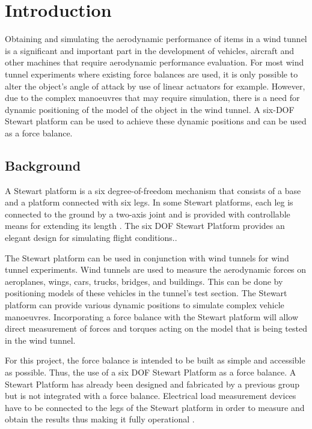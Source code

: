 \section{Introduction}
\label{sec:introduction}
Obtaining and simulating the aerodynamic performance of items in a wind tunnel is a
significant and important part in the development of vehicles, aircraft and other machines
that require aerodynamic performance evaluation. For most wind tunnel experiments where existing force balances are used,
it is only possible to alter the object's angle of attack by use of linear  actuators for example.
However, due to the complex manoeuvres that
may require simulation, there is a need for dynamic positioning of the model of the object
in the wind tunnel. A six-DOF Stewart platform can be used to achieve these dynamic positions and can be used as a force balance.
\subsection{Background}
A Stewart platform is a six degree-of-freedom mechanism that consists of a base and a platform connected with six legs. In some Stewart platforms,
each leg is connected to the ground by a two-axis joint and is provided with controllable means for extending its length
\cite{wittenburg2016stewart}. The six DOF Stewart Platform provides an elegant design for simulating flight conditions.\cite{stewart1965platform}.

The Stewart platform can be used in conjunction with wind tunnels for wind tunnel experiments. Wind tunnels are used to measure the aerodynamic forces on aeroplanes, wings, cars, trucks, bridges, and buildings. This can be done by positioning models of these vehicles in the tunnel's test section.
The Stewart platform can provide various dynamic positions to simulate complex vehicle manoeuvres. Incorporating a force balance with the Stewart platform will allow direct measurement of forces and torques acting on the model that is being tested in the wind tunnel.

For this project, the force balance is intended to be built as simple and accessible as possible. Thus, the use of a six DOF Stewart Platform as a force balance.
A Stewart Platform has already been designed and fabricated by a previous group but is not integrated with a force balance.
Electrical load measurement devices have to be connected to the legs of the Stewart platform in order to measure and obtain the results thus making it fully operational \cite{caleb}.

